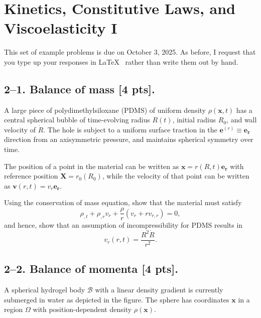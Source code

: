 \setcounter{section}{1} %

\section{Kinetics, Constitutive Laws, and Viscoelasticity I}
\label{PS2}

This set of example problems is due on October 3, 2025. 
As before, I request that you type up your responses in \LaTeX~ rather than write them out by hand. 

\medskip
\subsection*{2--1. \textbf{Balance of mass} [4 pts].} 
A large piece of polydimethylsiloxane (PDMS) of uniform density $\rho(\bm{x},t)$ has a central spherical bubble of time-evolving radius $R(t)$, initial radius $R_0$, and wall velocity of $\dot{R}$. 
The hole is subject to a uniform surface traction in the $\bm{e}^{(r)} \equiv \bm{e}_{\bm{r}}$ direction from an axisymmetric pressure, and maintains spherical symmetry over time. 

\medskip
The position of a point in the material can be written as $\bm{x} = r(R,t) \bm{e}_{\bm{r}}$ with reference position $\bm{X} = r_0(R_0)$, while the velocity of that point can be written as $\bm{v}(r,t) = v_r \bm{e}_{\bm{r}}$.

\medskip
Using the conservation of mass equation, show that the material must satisfy
\begin{equation*}
\rho_{,t}+ \rho_{,r} v_r + \frac{\rho}{r} (v_r + r v_{r,r}) = 0,
\end{equation*}
and hence, show that an assumption of incompressibility for PDMS results in 
\begin{equation*}
v_r(r,t) = \frac{R^2 \dot{R}}{r^2}.
\end{equation*}

\medskip
\subsection*{2--2. \textbf{Balance of momenta} [4 pts].} A spherical hydrogel body $\mathcal{B}$ with a linear density gradient is currently submerged in water as depicted in the figure. 
The sphere has coordinates $\bm{x}$ in a region $\Omega$ with position-dependent density $\rho(\bm{x})$. 

